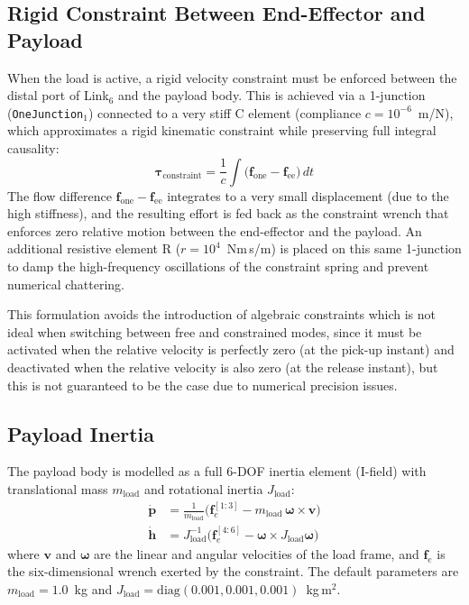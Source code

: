 \subsection{Rigid Constraint Between End-Effector and Payload}

When the load is active, a rigid velocity constraint must be enforced between the distal port of Link$_6$ and the payload body.
This is achieved via a 1-junction (\texttt{OneJunction$_1$}) connected to a very stiff C element (compliance $c = 10^{-6}$~m/N), which approximates a rigid kinematic constraint while preserving full integral causality:
\begin{equation}
  \boldsymbol{\tau}_{\text{constraint}} = \frac{1}{c}\int \bigl(\mathbf{f}_{\text{one}} - \mathbf{f}_{\text{ee}}\bigr)\,dt
\end{equation}
The flow difference $\mathbf{f}_{\text{one}} - \mathbf{f}_{\text{ee}}$ integrates to a very small displacement (due to the high stiffness), and the resulting effort is fed back as the constraint wrench that enforces zero relative motion between the end-effector and the payload.
An additional resistive element R ($r = 10^4$~Nm\,s/m) is placed on this same 1-junction to damp the high-frequency oscillations of the constraint spring and prevent numerical chattering.

This formulation avoids the introduction of algebraic constraints which is not ideal when switching between free and constrained modes, since it must be activated when the relative velocity is
perfectly zero (at the pick-up instant) and deactivated when the relative velocity is also zero (at the release instant), but this is not guaranteed to be the case due to numerical precision issues.

\subsection{Payload Inertia}

The payload body is modelled as a full 6-DOF inertia element (I-field) with translational mass $m_{\text{load}}$ and rotational inertia $J_{\text{load}}$:
\begin{align}
  \dot{\mathbf{p}} &= \frac{1}{m_{\text{load}}}\bigl(\mathbf{f}_e^{[1:3]} - m_{\text{load}}\,\boldsymbol{\omega}\times\mathbf{v}\bigr) \\
  \dot{\mathbf{h}} &= J_{\text{load}}^{-1}\bigl(\mathbf{f}_e^{[4:6]} - \boldsymbol{\omega}\times J_{\text{load}}\boldsymbol{\omega}\bigr)
\end{align}
where $\mathbf{v}$ and $\boldsymbol{\omega}$ are the linear and angular velocities of the load frame, and $\mathbf{f}_e$ is the six-dimensional wrench exerted by the constraint.
The default parameters are $m_{\text{load}} = 1.0$~kg and $J_{\text{load}} = \text{diag}(0.001, 0.001, 0.001)$~kg\,m$^2$.

